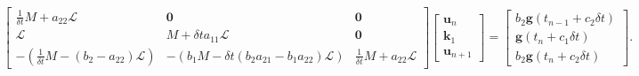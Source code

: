 \documentclass[a4paper,10pt]{article}
\begin{document}
\begin{align*}
\begin{bmatrix} \tfrac{1}{\delta t}M + a_{22}\mathcal{L} & \mathbf{0}  & \mathbf{0}  \\
	\mathcal{L} & M + \delta ta_{11}\mathcal{L} & \mathbf{0} \\
	-\left(\tfrac{1}{\delta t}M - (b_2 - a_{22}) \mathcal{L}\right) & -\left(b_1M  - \delta t(b_2 a_{21} - b_1a_{22}) \mathcal{L}\right) &
	\tfrac{1}{\delta t}M + a_{22}\mathcal{L} \end{bmatrix}
	\begin{bmatrix} \mathbf{u}_n \\ \mathbf{k}_1 \\ \mathbf{u}_{n+1} \end{bmatrix} = 
	\begin{bmatrix} b_2\mathbf{g}(t_{n-1}+c_2\delta t) \\ \mathbf{g}(t_{n}+c_1\delta t) \\ b_2\mathbf{g}(t_{n}+c_2\delta t) \end{bmatrix}.
\end{align*}
%
\end{document}
